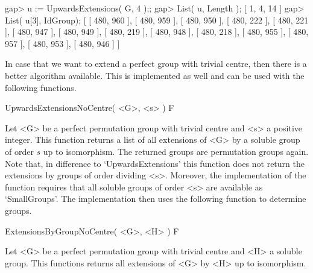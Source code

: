 gap> u := UpwardsExtensions( G, 4 );;
gap> List( u, Length );
[ 1, 4, 14 ]
gap> List( u[3], IdGroup);
[ [ 480, 960 ], [ 480, 959 ], [ 480, 950 ], [ 480, 222 ], [ 480, 221 ], 
  [ 480, 947 ], [ 480, 949 ], [ 480, 219 ], [ 480, 948 ], [ 480, 218 ], 
  [ 480, 955 ], [ 480, 957 ], [ 480, 953 ], [ 480, 946 ] ]
\endexample

In case that we want to extend a perfect group with trivial
centre, then there is a better algorithm available. This is
implemented as well and can be used with the following functions.

\> UpwardsExtensionsNoCentre( <G>, <s> ) F

Let <G> be a perfect permutation group with trivial centre and <s> 
a positive integer. This function returns a list of all extensions 
of <G> by a soluble group of order $s$ up to isomorphism. The returned 
groups are permutation groups again. Note that, in difference to 
`UpwardsExtensions' this function does not return the extensions by
groups of order dividing <s>. Moreover, the implementation of the
function requires that all soluble groups of order <s> are available
as `SmallGroups'. The implementation then uses the following function
to determine groups.

\> ExtensionsByGroupNoCentre( <G>, <H> ) F

Let <G> be a perfect permutation group with trivial centre and <H> a soluble
group. This functions returns all extensions of <G> by <H> up to isomorphism.  
